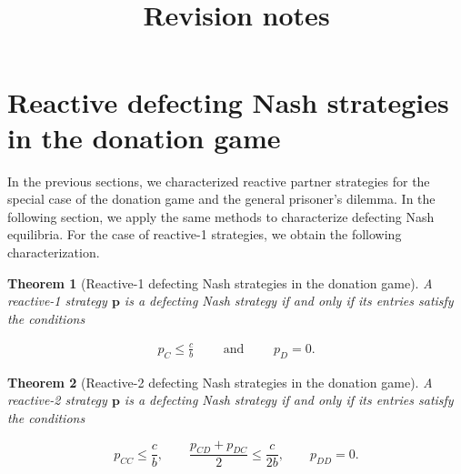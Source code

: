 \documentclass[11pt]{article}
\title{~\\[-1.5cm]{\sffamily \Large Revision notes}\\[-0.3cm]}
\date{\empty}
\theoremstyle{plainCl1}
\newtheorem{theorem}{Theorem}
\theoremstyle{plainCl2}
\begin{document}

\section{Reactive defecting Nash strategies in the donation game}\label{section:defecting_donation_game}

In the previous sections, we characterized reactive partner strategies for the
special case of the donation game and the general prisoner's dilemma. In the
following section, we apply the same methods to characterize defecting Nash
equilibria. For the case of reactive-1 strategies, we obtain the following
characterization.


\begin{theorem}[Reactive-1 defecting Nash strategies in the donation game]
\label{theorem:reactive_one_defecting_strategies}
A reactive-1 strategy $\mathbf{p}$ is a defecting Nash strategy if and only if
its entries satisfy the conditions

\begin{equation}
  \begin{array}{rcl}
    p_{C} \le  \frac{c}{b} \qquad \text{ and } \qquad  p_{D} \!=\! 0.
\end{array}
\end{equation}
\end{theorem}



\begin{theorem}[Reactive-2 defecting Nash strategies in the donation game]
\label{theorem:reactive_two_defecting_strategies}
A reactive-2 strategy $\mathbf{p}$ is a defecting Nash strategy if and only if
its entries satisfy the conditions

\begin{equation}\label{eq:defecting_conditions_two}
  p_{CC} \le \frac{c}{b}, \qquad \displaystyle \frac{p_{CD} \!+\! p_{DC}}{2} \le \frac{c}{2b}, \qquad p_{DD} = 0.
\end{equation}
\end{theorem}

\end{document}
